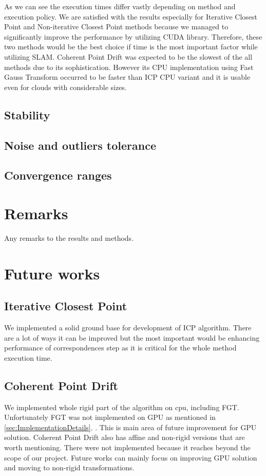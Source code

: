 \documentclass[titlepage]{article}
\begin{document}
As we can see the execution times differ vastly depending on method and execution policy. We are satisfied with the results especially for Iterative Closest Point and Non-iterative Closest Point methods because we managed to significantly improve the performance by utilizing CUDA library. Therefore, these two methods would be the best choice if time is the most important factor while utilizing SLAM. Coherent Point Drift was expected to be the slowest of the all methods due to its sophistication. However its CPU implementation using Fast Gauss Transform occurred to be faster than ICP CPU variant and it is usable even for clouds with considerable sizes.

\subsection{Stability}

\subsection{Noise and outliers tolerance}

\subsection{Convergence ranges}

\section{Remarks}
Any remarks to the results and methods.

\section{Future works}

\subsection{Iterative Closest Point}
We implemented a solid ground base for development of ICP algorithm. There are a lot of ways it can be improved but the most important would be enhancing performance of correspondences step as it is critical for the whole method execution time.

\subsection{Coherent Point Drift}
We implemented whole rigid part of the algorithm on cpu, including FGT. Unfortunately FGT was not implemented on GPU as mentioned in \ref{sec:ImplementationDetails}. . This is main area of future improvement for GPU solution. Coherent Point Drift also has affine and non-rigid versions that are worth mentioning. There were not implemented because it reaches beyond the scope of our project. Future works can mainly focus on improving GPU solution and moving to non-rigid transformations.
\end{document}
